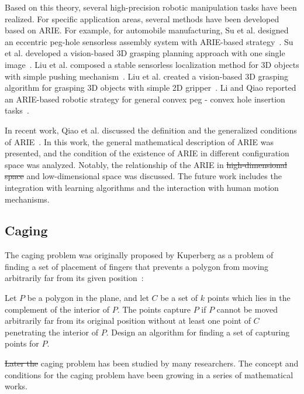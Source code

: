 \documentclass[journal,twoside,web]{ieeecolor}
\providecommand{\DIFadd}[1]{{\protect\color{blue}\uwave{#1}}} %
\providecommand{\DIFdel}[1]{{\protect\color{red}\sout{#1}}}                      %
\providecommand{\DIFaddbegin}{} %
\providecommand{\DIFaddend}{} %
\providecommand{\DIFdelbegin}{} %
\providecommand{\DIFdelend}{} %
\newcommand{\DIFscaledelfig}{0.5}
\newlength{\DIFdelgraphicswidth} %
\newlength{\DIFdelgraphicsheight} %
\newcommand{\DIFaddincludegraphics}[2][]{{\color{blue}\fbox{\DIFOincludegraphics[#1]{#2}}}} %
\newcommand{\DIFdelincludegraphics}[2][]{%
\sbox{\DIFdelgraphicsbox}{\DIFOincludegraphics[#1]{#2}}%
\settoboxwidth{\DIFdelgraphicswidth}{\DIFdelgraphicsbox} %
\settoboxtotalheight{\DIFdelgraphicsheight}{\DIFdelgraphicsbox} %
\scalebox{\DIFscaledelfig}{%
\parbox[b]{\DIFdelgraphicswidth}{\usebox{\DIFdelgraphicsbox}\\[-\baselineskip] \rule{\DIFdelgraphicswidth}{0em}}\llap{\resizebox{\DIFdelgraphicswidth}{\DIFdelgraphicsheight}{%
\setlength{\unitlength}{\DIFdelgraphicswidth}%
\begin{picture}(1,1)%
\thicklines\linethickness{2pt} %
{\color[rgb]{1,0,0}\put(0,0){\framebox(1,1){}}}%
{\color[rgb]{1,0,0}\put(0,0){\line( 1,1){1}}}%
{\color[rgb]{1,0,0}\put(0,1){\line(1,-1){1}}}%
\end{picture}%
}\hspace*{3pt}}} %
} %
\DeclareRobustCommand{\DIFaddbegin}{\DIFOaddbegin \let\includegraphics\DIFaddincludegraphics} %
\DeclareRobustCommand{\DIFaddend}{\DIFOaddend \let\includegraphics\DIFOincludegraphics} %
\DeclareRobustCommand{\DIFdelbegin}{\DIFOdelbegin \let\includegraphics\DIFdelincludegraphics} %
\DeclareRobustCommand{\DIFdelend}{\DIFOaddend \let\includegraphics\DIFOincludegraphics} %
\begin{document}
Based on this theory, several high-precision robotic manipulation tasks have been realized. For specific application areas, several methods have been developed based on ARIE. 
For example, for automobile manufacturing, 
Su et al. designed an eccentric peg-hole sensorless assembly system with ARIE-based strategy~\cite{Su2012a, Su2012b}. 
Su et al. developed a vision-based 3D grasping planning approach with one single image~\cite{Su2009}. 
Liu et al. composed a stable sensorless localization method for 3D objects with \DIFaddbegin \DIFadd{a }\DIFaddend simple pushing mechanism~\cite{Liu2011}. 
Liu et al. created a vision-based 3D grasping algorithm for grasping 3D objects with \DIFaddbegin \DIFadd{a }\DIFaddend simple 2D gripper~\cite{Liu2014}.
Li and Qiao reported an ARIE-based robotic strategy for general convex peg - convex hole insertion tasks~\cite{Li2017}.

In recent work, Qiao et al. discussed the definition and the generalized conditions of ARIE~\cite{Qiao2015}. In this work, the general mathematical description of ARIE was presented, and the condition of the existence of ARIE in different configuration space was analyzed. Notably, the relationship of the ARIE in \DIFdelbegin \DIFdel{high-dimensional space }\DIFdelend \DIFaddbegin \DIFadd{high- }\DIFaddend and low-dimensional space was discussed. The future work includes the integration with learning algorithms and the interaction with human motion mechanisms.


\subsection{Caging}
\label{subsec:caging}

The caging problem was originally proposed by Kuperberg as a problem of finding a set of placement of fingers that prevents a polygon from moving arbitrarily far from its given position~\cite{kuperberg1990problems}:
\DIFdelbegin %

\DIFdelend \DIFaddbegin \DIFadd{``}\DIFaddend Let $P$ be a polygon in the plane, and let $C$ be a set of $k$ points which lies in the complement of the interior of $P$. The points capture $P$ if $P$ cannot be moved arbitrarily far from its original position without at least one point of $C$ penetrating the interior of $P$. Design an algorithm for finding a set of capturing points for $P$.\DIFaddbegin \DIFadd{''
}\DIFaddend 

\DIFdelbegin \DIFdel{Later the }\DIFdelend \DIFaddbegin \DIFadd{The }\DIFaddend caging problem has been studied by many researchers. The concept and conditions for the caging problem have been growing in a series of mathematical works. 
\end{document}

